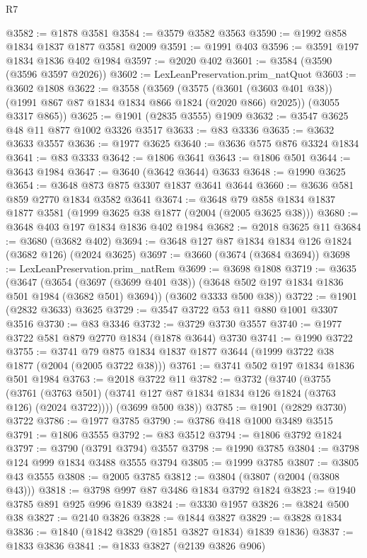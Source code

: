 \begin{lexlean}{R7}
\begin{coremodule}
@3582 := @1878 @3581
@3584 := @3579 @3582 @3563
@3590 := @1992 @858 @1834 @1837 @1877 @3581 @2009
@3591 := @1991 @403
@3596 := @3591 @197 @1834 @1836 @402 @1984
@3597 := @2020 @402
@3601 := @3584 (@3590 (@3596 @3597 @2026))
@3602 := LexLeanPreservation.prim_natQuot
@3603 := @3602 @1808
@3622 := @3558
    (@3569
      (@3575 (@3601 (@3603 @401 @38)) (@1991 @867 @87 @1834 @1834 @866 @1824 (@2020 @866) @2025))
      (@3055 @3317 @865))
@3625 := @1901 (@2835 @3555) @1909
@3632 := @3547 @3625 @48 @11 @877 @1002 @3326 @3517
@3633 := @83 @3336
@3635 := @3632 @3633 @3557
@3636 := @1977 @3625
@3640 := @3636 @575 @876 @3324 @1834
@3641 := @83 @3333
@3642 := @1806 @3641
@3643 := @1806 @501
@3644 := @3643 @1984
@3647 := @3640 (@3642 @3644) @3633
@3648 := @1990 @3625
@3654 := @3648 @873 @875 @3307 @1837 @3641 @3644
@3660 := @3636 @581 @859 @2770 @1834 @3582 @3641
@3674 := @3648 @79 @858 @1834 @1837 @1877 @3581 (@1999 @3625 @38 @1877 (@2004 (@2005 @3625 @38)))
@3680 := @3648 @403 @197 @1834 @1836 @402 @1984
@3682 := @2018 @3625 @11
@3684 := @3680 (@3682 @402)
@3694 := @3648 @127 @87 @1834 @1834 @126 @1824 (@3682 @126) (@2024 @3625)
@3697 := @3660 (@3674 (@3684 @3694))
@3698 := LexLeanPreservation.prim_natRem
@3699 := @3698 @1808
@3719 := @3635
    (@3647
      (@3654 (@3697 (@3699 @401 @38)) (@3648 @502 @197 @1834 @1836 @501 @1984 (@3682 @501) @3694))
      (@3602 @3333 @500 @38))
@3722 := @1901 (@2832 @3633) @3625
@3729 := @3547 @3722 @53 @11 @880 @1001 @3307 @3516
@3730 := @83 @3346
@3732 := @3729 @3730 @3557
@3740 := @1977 @3722 @581 @879 @2770 @1834 (@1878 @3644) @3730
@3741 := @1990 @3722
@3755 := @3741 @79 @875 @1834 @1837 @1877 @3644 (@1999 @3722 @38 @1877 (@2004 (@2005 @3722 @38)))
@3761 := @3741 @502 @197 @1834 @1836 @501 @1984
@3763 := @2018 @3722 @11
@3782 := @3732
    (@3740
      (@3755
        (@3761 (@3763 @501) (@3741 @127 @87 @1834 @1834 @126 @1824 (@3763 @126) (@2024 @3722))))
      (@3699 @500 @38))
@3785 := @1901 (@2829 @3730) @3722
@3786 := @1977 @3785
@3790 := @3786 @418 @1000 @3489 @3515
@3791 := @1806 @3555
@3792 := @83 @3512
@3794 := @1806 @3792 @1824
@3797 := @3790 (@3791 @3794) @3557
@3798 := @1990 @3785
@3804 := @3798 @124 @999 @1834 @3488 @3555 @3794
@3805 := @1999 @3785
@3807 := @3805 @43 @3555
@3808 := @2005 @3785
@3812 := @3804 (@3807 (@2004 (@3808 @43)))
@3818 := @3798 @997 @87 @3486 @1834 @3792 @1824
@3823 := @1940 @3785 @891 @925 @996 @1839
@3824 := @3330 @1957
@3826 := @3824 @500 @38
@3827 := @2140 @3826
@3828 := @1844 @3827
@3829 := @3828 @1834
@3836 := @1840 (@1842 @3829 (@1851 @3827 @1834) @1839 @1836)
@3837 := @1833 @3836
@3841 := @1833 @3827 (@2139 @3826 @906)

\end{coremodule}
\end{lexlean}
